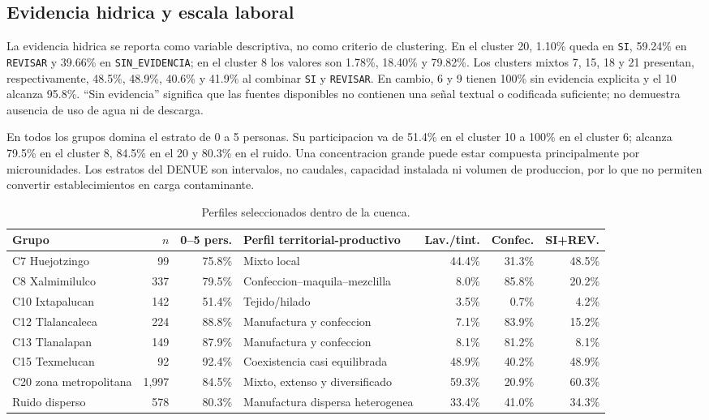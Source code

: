 \documentclass[11pt,letterpaper]{article}
\begin{document}
\subsection{Evidencia hidrica y escala laboral}

La evidencia hidrica se reporta como variable descriptiva, no como criterio de clustering. En el cluster 20, 1.10\% queda en \texttt{SI}, 59.24\% en \texttt{REVISAR} y 39.66\% en \texttt{SIN\_EVIDENCIA}; en el cluster 8 los valores son 1.78\%, 18.40\% y 79.82\%. Los clusters mixtos 7, 15, 18 y 21 presentan, respectivamente, 48.5\%, 48.9\%, 40.6\% y 41.9\% al combinar \texttt{SI} y \texttt{REVISAR}. En cambio, 6 y 9 tienen 100\% sin evidencia explicita y el 10 alcanza 95.8\%. ``Sin evidencia'' significa que las fuentes disponibles no contienen una señal textual o codificada suficiente; no demuestra ausencia de uso de agua ni de descarga.

En todos los grupos domina el estrato de 0 a 5 personas. Su participacion va de 51.4\% en el cluster 10 a 100\% en el cluster 6; alcanza 79.5\% en el cluster 8, 84.5\% en el 20 y 80.3\% en el ruido. Una concentracion grande puede estar compuesta principalmente por microunidades. Los estratos del DENUE son intervalos, no caudales, capacidad instalada ni volumen de produccion, por lo que no permiten convertir establecimientos en carga contaminante.

\begin{table}[H]
\centering
\scriptsize
\caption{Perfiles seleccionados dentro de la cuenca.}
\begin{tabularx}{\textwidth}{lrrXrrr}
\toprule
\textbf{Grupo} & \textbf{$n$} & \textbf{0--5 pers.} & \textbf{Perfil territorial-productivo} & \textbf{Lav./tint.} & \textbf{Confec.} & \textbf{SI+REV.} \\
\midrule
C7 Huejotzingo & 99 & 75.8\% & Mixto local & 44.4\% & 31.3\% & 48.5\% \\
C8 Xalmimilulco & 337 & 79.5\% & Confeccion--maquila--mezclilla & 8.0\% & 85.8\% & 20.2\% \\
C10 Ixtapalucan & 142 & 51.4\% & Tejido/hilado & 3.5\% & 0.7\% & 4.2\% \\
C12 Tlalancaleca & 224 & 88.8\% & Manufactura y confeccion & 7.1\% & 83.9\% & 15.2\% \\
C13 Tlanalapan & 149 & 87.9\% & Manufactura y confeccion & 8.1\% & 81.2\% & 8.1\% \\
C15 Texmelucan & 92 & 92.4\% & Coexistencia casi equilibrada & 48.9\% & 40.2\% & 48.9\% \\
C20 zona metropolitana & 1,997 & 84.5\% & Mixto, extenso y diversificado & 59.3\% & 20.9\% & 60.3\% \\
Ruido disperso & 578 & 80.3\% & Manufactura dispersa heterogenea & 33.4\% & 41.0\% & 34.3\% \\
\bottomrule
\end{tabularx}
\end{table}
\end{document}
